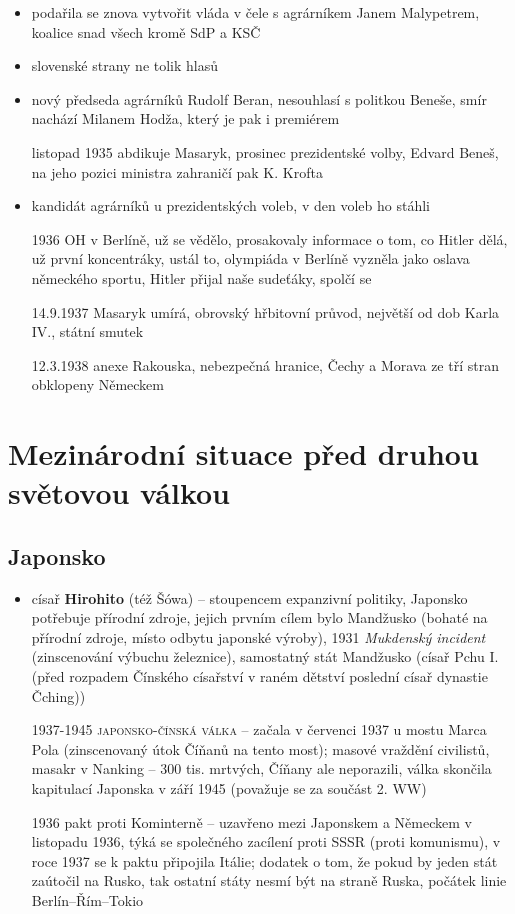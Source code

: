 \documentclass{article}
\begin{document}
\begin{itemize}
    \item podařila se znova vytvořit vláda v čele s agrárníkem Janem Malypetrem, koalice snad všech kromě SdP a KSČ
    \item slovenské strany ne tolik hlasů
    \item nový předseda agrárníků Rudolf Beran, nesouhlasí s politkou Beneše, smír nachází Milanem Hodža, který je pak i premiérem
    \item[listopad 1935] abdikuje Masaryk, prosinec prezidentské volby, Edvard Beneš, na jeho pozici ministra zahraničí pak K. Krofta
    \item kandidát agrárníků u prezidentských voleb, v den voleb ho stáhli
    \item[1936] OH v Berlíně, už se vědělo, prosakovaly informace o tom, co Hitler dělá, už první koncentráky, ustál to, olympiáda v Berlíně vyzněla jako oslava německého sportu, Hitler přijal naše sudeťáky, spolčí se
    \item[14.9.1937] Masaryk umírá, obrovský hřbitovní průvod, největší od dob Karla IV., státní smutek
    \item[12.3.1938] anexe Rakouska, nebezpečná hranice, Čechy a Morava ze tří stran obklopeny Německem
\end{itemize}

\section*{Mezinárodní situace před druhou světovou válkou}
\subsection*{Japonsko}
\begin{itemize}
    \item císař \textbf{Hirohito} (též Šówa) -- stoupencem expanzivní politiky, Japonsko potřebuje přírodní zdroje, jejich prvním cílem bylo Mandžusko (bohaté na přírodní zdroje, místo odbytu japonské výroby), 1931 \textit{Mukdenský incident} (zinscenování výbuchu železnice), samostatný stát Mandžusko (císař Pchu I. (před rozpadem Čínského císařství v raném dětství poslední císař dynastie Čching))
    \item[1937-1945] \textsc{japonsko-čínská válka} -- začala v červenci 1937 u mostu Marca Pola (zinscenovaný útok Číňanů na tento most); masové vraždění civilistů, masakr v Nanking -- 300 tis. mrtvých, Číňany ale neporazili, válka skončila kapitulací Japonska v září 1945 (považuje se za součást 2. WW)
    \item[1936] pakt proti Kominterně -- uzavřeno mezi Japonskem a Německem v listopadu 1936, týká se společného zacílení proti SSSR (proti komunismu), v roce 1937 se k paktu připojila Itálie;  dodatek o tom, že pokud by jeden stát zaútočil na Rusko, tak ostatní státy nesmí být na straně Ruska, počátek linie Berlín--Řím--Tokio
\end{itemize}
\end{document}
